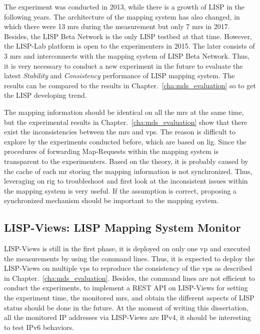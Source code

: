 The experiment was conducted in 2013, while there is a growth of LISP in the following years. The architecture of the mapping system has also changed, in which there were 13 \acrshort{mr}s during the measurement but only 7 \acrshort{mr}s in 2017. Besides, the LISP Beta Network is the only LISP testbed at that time. However, the LISP-Lab platform is open to the experimenters in 2015. The later consists of 3 \acrshort{mr}s and interconnects with the mapping system of LISP Beta Network. Thus, it is very necessary to conduct a new experiment in the future to evaluate the latest \emph{Stability} and \emph{Consistency} performance of LISP mapping system. The results can be compared to the results in Chapter.~\ref{cha:mds_evaluation} so to get the LISP developing trend. 

The mapping information should be identical on all the \acrshort{mr}s at the same time, but the experimental results in Chapter.~\ref{cha:mds_evaluation} show that there exist the inconsistencies between the \acrshort{mr}s and \acrshort{vp}s. The reason is difficult to explore by the experiments conducted before, which are based on \acrshort{lig}. Since the procedures of forwarding Map-Requests within the mapping system is transparent to the experimenters. Based on the theory, it is probably caused by the cache of each \acrshort{mr} storing the mapping information is not synchronized. Thus, leveraging on \acrshort{rig} to troubleshoot and first look at the inconsistent issues within the mapping system is very useful. If the assumption is correct, proposing a synchronized mechanism should be important to the mapping system.

\subsection{LISP-Views: LISP Mapping System Monitor}    
LISP-Views is still in the first phase, it is deployed on only one \acrshort{vp} and executed the measurements by using the command lines. Thus, it is expected to deploy the LISP-Views on multiple \acrshort{vp}s to reproduce the consistency of the \acrshort{vp}s as described in Chapter.~\ref{cha:mds_evaluation}. Besides, the command lines are not efficient to conduct the experiments, to implement a REST API on LISP-Views for setting the experiment time, the monitored \acrshort{mr}s, and obtain the different aspects of LISP status should be done in the future. At the moment of writing this dissertation, all the monitored IP addresses via LISP-Views are IPv4, it should be interesting to test IPv6 behaviors. 

